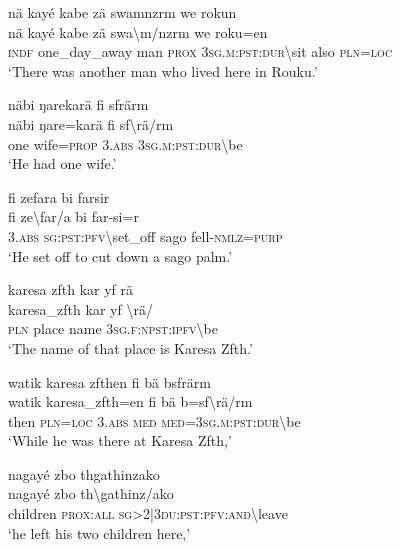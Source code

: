 \ea\label{ex:9:a2225}
nä kayé kabe zä swamnzrm we rokun\\
\gll nä	kayé	kabe	zä	swa{\textbackslash}m/nzrm	we	roku=en\\
     \textsc{indf}	one\_day\_away	man	\textsc{prox}	3\textsc{sg}.\textsc{m}:\textsc{pst}:\textsc{dur}{\textbackslash}sit	also	\textsc{pln}=\textsc{loc}\\
\glt `There was another man who lived here in Rouku.'
\z

\ea\label{ex:9:a2227}
näbi ŋarekarä fi sfrärm\\
\gll näbi	ŋare=karä	fi	sf{\textbackslash}rä/rm\\
     one	wife=\textsc{prop}	3.\textsc{abs}	3\textsc{sg}.\textsc{m}:\textsc{pst}:\textsc{dur}{\textbackslash}be\\
\glt `He had one wife.'
\z

\ea\label{ex:9:a2228}
fi zefara bi farsir\\
\gll fi	ze{\textbackslash}far/a	bi	far-si=r\\
     3.\textsc{abs}	\textsc{sg}:\textsc{pst}:\textsc{pfv}{\textbackslash}set\_off	sago	fell-\textsc{nmlz}=\textsc{purp}\\
\glt `He set off to cut down a sago palm.'
\z

\ea\label{ex:9:a2230}
karesa zfth kar yf rä\\
\gll karesa\_zfth	kar	yf	{\textbackslash}rä/\\
     \textsc{pln}	place	name	3\textsc{sg}.\textsc{f}:\textsc{npst}:\textsc{ipfv}{\textbackslash}be\\
\glt `The name of that place is Karesa Zfth.'
\z

\ea\label{ex:9:a2232}
watik karesa zfthen fi bä bsfrärm\\
\gll watik	karesa\_zfth=en	fi	bä	b=sf{\textbackslash}rä/rm\\
     then	\textsc{pln}=\textsc{loc}	3.\textsc{abs}	\textsc{med}	\textsc{med}=3\textsc{sg}.\textsc{m}:\textsc{pst}:\textsc{dur}{\textbackslash}be\\
\glt `While he was there at Karesa Zfth,'
\z

\ea\label{ex:9:a2234}
nagayé zbo thgathinzako\\
\gll nagayé	zbo	th{\textbackslash}gathinz/ako\\
     children	\textsc{prox}:\textsc{all}	\textsc{sg}>2|3\textsc{du}:\textsc{pst}:\textsc{pfv}:\textsc{and}{\textbackslash}leave\\
\glt `he left his two children here,'
\z

